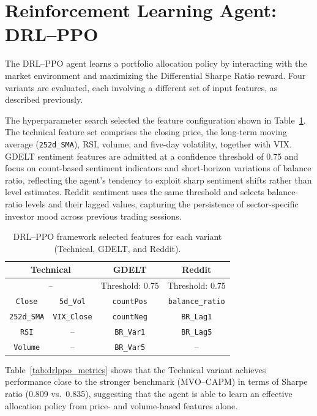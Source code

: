 \section{Reinforcement Learning Agent: DRL--PPO}

The DRL--PPO agent learns a portfolio allocation policy by interacting with the market environment and maximizing the Differential Sharpe Ratio reward. Four variants are evaluated, each involving a different set of input features, as described previously.

The hyperparameter search selected the feature configuration shown in Table~\ref{tab:drlppo_features}. The technical feature set comprises the closing price, the long-term moving average (\texttt{252d\_SMA}), RSI, volume, and five-day volatility, together with VIX. GDELT sentiment features are admitted at a confidence threshold of 0.75 and focus on count-based sentiment indicators and short-horizon variations of balance ratio, reflecting the agent's tendency to exploit sharp sentiment shifts rather than level estimates. Reddit sentiment uses the same threshold and selects balance-ratio levels and their lagged values, capturing the persistence of sector-specific investor mood across previous trading sessions.

\begin{table}[ht]
\centering
\caption{DRL--PPO framework selected features for each variant (Technical, GDELT, and Reddit).}
\label{tab:drlppo_features}
\renewcommand{\arraystretch}{1.2}
\begin{tabular}{|cc|c|c|}
\hline
\multicolumn{2}{|c|}{\textbf{Technical}} & \textbf{GDELT} & \textbf{Reddit} \\
\hline
\multicolumn{2}{|c|}{--} & Threshold: 0.75 & Threshold: 0.75 \\
\hline
\texttt{Close}      & \texttt{5d\_Vol}      & \texttt{countPos} & \texttt{balance\_ratio} \\
\texttt{252d\_SMA}  & \texttt{VIX\_Close}   & \texttt{countNeg} & \texttt{BR\_Lag1} \\
\texttt{RSI}        & --                    & \texttt{BR\_Var1} & \texttt{BR\_Lag5} \\
\texttt{Volume}     & --                    & \texttt{BR\_Var5} & -- \\
\hline
\end{tabular}
\end{table}

Table~\ref{tab:drlppo_metrics} shows that the Technical variant achieves performance close to the stronger benchmark (MVO--CAPM) in terms of Sharpe ratio (0.809 vs.\ 0.835), suggesting that the agent is able to learn an effective allocation policy from price- and volume-based features alone.

